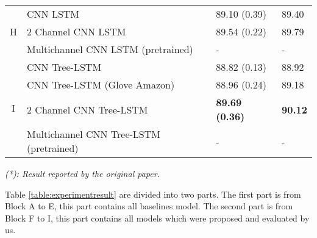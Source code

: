 \begin{table}[H]
\begin{tabular}{c|lll}
\hline
\hline
        \multirow{3}{*}{H} & CNN LSTM                                 & 89.10 (0.39)  & 89.40 \Tstrut  \\
        & 2 Channel CNN LSTM                        & 89.54    (0.22) & 89.79    \\
        & Multichannel CNN LSTM (pretrained) & - & - \\
\hline 
        \multirow{4}{*}{I} & CNN Tree-LSTM                            & 88.82 (0.13) & 88.92 \\
        & CNN Tree-LSTM (Glove Amazon)             & 88.96 (0.24) & 89.18 \\
        & 2 Channel CNN Tree-LSTM  &\textbf{89.69 (0.36)} & \textbf{90.12}    \\
        & Multichannel CNN Tree-LSTM (pretrained)        & - & -        \\
    \end{tabular}
\end{table}

\textit{(*): Result reported by the original paper.}


Table \ref{table:experimentresult} are divided into two parts. 
The first part is from Block A to E, this part contains all baselines model.
The second part is from Block F to I, this part contains all models which were proposed and evaluated by us.

